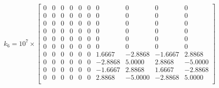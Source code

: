 \documentclass[8pt]{article}
\begin{document}
\[
k_6 = 10^7 \times
\begin{bmatrix}
0 & 0 & 0 & 0 & 0 & 0 & 0 & 0 & 0 & 0 \\
0 & 0 & 0 & 0 & 0 & 0 & 0 & 0 & 0 & 0 \\
0 & 0 & 0 & 0 & 0 & 0 & 0 & 0 & 0 & 0 \\
0 & 0 & 0 & 0 & 0 & 0 & 0 & 0 & 0 & 0 \\
0 & 0 & 0 & 0 & 0 & 0 & 0 & 0 & 0 & 0 \\
0 & 0 & 0 & 0 & 0 & 0 & 0 & 0 & 0 & 0 \\
0 & 0 & 0 & 0 & 0 & 0 & 1.6667 & -2.8868 & -1.6667 & 2.8868 \\
0 & 0 & 0 & 0 & 0 & 0 & -2.8868 & 5.0000 & 2.8868 & -5.0000 \\
0 & 0 & 0 & 0 & 0 & 0 & -1.6667 & 2.8868 & 1.6667 & -2.8868 \\
0 & 0 & 0 & 0 & 0 & 0 & 2.8868 & -5.0000 & -2.8868 & 5.0000 \\
\end{bmatrix}
\]
\end{document}
